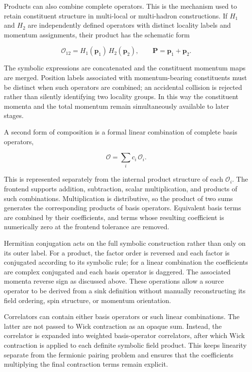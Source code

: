 \documentclass[11pt]{article}
\begin{document}
Products can also combine complete operators. This is the mechanism used to
retain constituent structure in multi-local or multi-hadron constructions. If
\(H_1\) and \(H_2\) are independently defined operators with distinct locality
labels and momentum assignments, their product has the schematic form

\begin{equation}
\mathcal O_{12}
=
H_1(\mathbf p_1)\,H_2(\mathbf p_2),
\qquad
\mathbf P=\mathbf p_1+\mathbf p_2.
\label{eq:composite_hadron_product}
\end{equation}

The symbolic expressions are concatenated and the constituent momentum maps are
merged. Position labels associated with momentum-bearing constituents must be
distinct when such operators are combined; an accidental collision is rejected
rather than silently identifying two locality groups. In this way the
constituent momenta and the total momentum remain simultaneously available to
later stages.

A second form of composition is a formal linear combination of complete basis
operators,

\begin{equation}
\mathcal O
=
\sum_i c_i\,\mathcal O_i .
\label{eq:operator_linear_combination}
\end{equation}

This is represented separately from the internal product structure of each
\(\mathcal O_i\). The frontend supports addition, subtraction, scalar
multiplication, and products of such combinations. Multiplication is
distributive, so the product of two sums generates the corresponding products
of basis operators. Equivalent basis terms are combined by their coefficients,
and terms whose resulting coefficient is numerically zero at the frontend
tolerance are removed.

Hermitian conjugation acts on the full symbolic construction rather than only
on its outer label. For a product, the factor order is reversed and each factor
is conjugated according to its symbolic rule; for a linear combination the
coefficients are complex conjugated and each basis operator is daggered. The
associated momenta reverse sign as discussed above. These operations allow a
source operator to be derived from a sink definition without manually
reconstructing its field ordering, spin structure, or momentum orientation.

Correlators can contain either basis operators or such linear combinations.
The latter are not passed to Wick contraction as an opaque sum. Instead, the
correlator is expanded into weighted basis-operator correlators, after which
Wick contraction is applied to each definite symbolic field product. This keeps
linearity separate from the fermionic pairing problem and ensures that the
coefficients multiplying the final contraction terms remain explicit.
\end{document}
